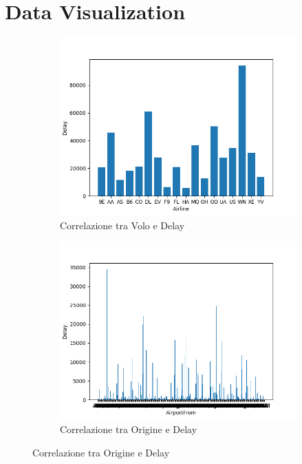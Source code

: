 \documentclass{article}
\begin{document}
\section{Data Visualization}
\begin{figure}[H]
  \centering
  \begin{subfigure}[b]{0.4\linewidth}
    \includegraphics[width=\linewidth]{AirlineDelayCorrelation}
     \caption{Correlazione tra Volo e Delay}
  \end{subfigure}
  \begin{subfigure}[b]{0.4\linewidth}
    \includegraphics[width=\linewidth]{AirportFromDelayCorrelation}
    \caption{Correlazione tra Origine e Delay}
  \end{subfigure}

\end{figure}
\end{document}
